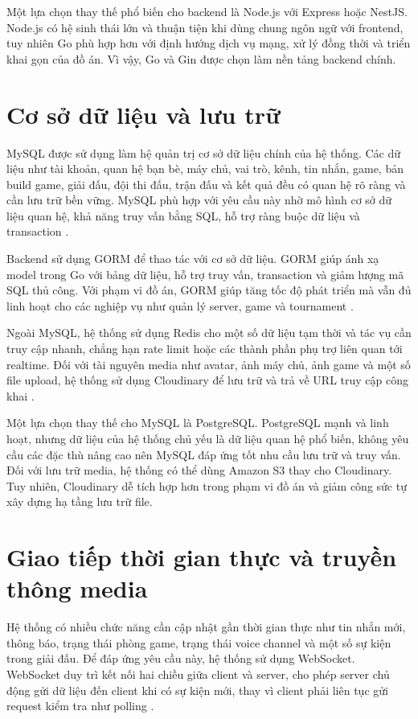 \documentclass[../DoAn.tex]{subfiles}
\begin{document}
Một lựa chọn thay thế phổ biến cho backend là Node.js với Express hoặc NestJS. Node.js có hệ sinh thái lớn và thuận tiện khi dùng chung ngôn ngữ với frontend, tuy nhiên Go phù hợp hơn với định hướng dịch vụ mạng, xử lý đồng thời và triển khai gọn của đồ án. Vì vậy, Go và Gin được chọn làm nền tảng backend chính.

\section{Cơ sở dữ liệu và lưu trữ}
\label{section:3.4}

MySQL được sử dụng làm hệ quản trị cơ sở dữ liệu chính của hệ thống. Các dữ liệu như tài khoản, quan hệ bạn bè, máy chủ, vai trò, kênh, tin nhắn, game, bản build game, giải đấu, đội thi đấu, trận đấu và kết quả đều có quan hệ rõ ràng và cần lưu trữ bền vững. MySQL phù hợp với yêu cầu này nhờ mô hình cơ sở dữ liệu quan hệ, khả năng truy vấn bằng SQL, hỗ trợ ràng buộc dữ liệu và transaction \cite{mysql-84}.

Backend sử dụng GORM để thao tác với cơ sở dữ liệu. GORM giúp ánh xạ model trong Go với bảng dữ liệu, hỗ trợ truy vấn, transaction và giảm lượng mã SQL thủ công. Với phạm vi đồ án, GORM giúp tăng tốc độ phát triển mà vẫn đủ linh hoạt cho các nghiệp vụ như quản lý server, game và tournament \cite{gorm-docs}.

Ngoài MySQL, hệ thống sử dụng Redis cho một số dữ liệu tạm thời và tác vụ cần truy cập nhanh, chẳng hạn rate limit hoặc các thành phần phụ trợ liên quan tới realtime. Đối với tài nguyên media như avatar, ảnh máy chủ, ảnh game và một số file upload, hệ thống sử dụng Cloudinary để lưu trữ và trả về URL truy cập công khai \cite{redis-docs,cloudinary-go}.

Một lựa chọn thay thế cho MySQL là PostgreSQL. PostgreSQL mạnh và linh hoạt, nhưng dữ liệu của hệ thống chủ yếu là dữ liệu quan hệ phổ biến, không yêu cầu các đặc thù nâng cao nên MySQL đáp ứng tốt nhu cầu lưu trữ và truy vấn. Đối với lưu trữ media, hệ thống có thể dùng Amazon S3 thay cho Cloudinary. Tuy nhiên, Cloudinary dễ tích hợp hơn trong phạm vi đồ án và giảm công sức tự xây dựng hạ tầng lưu trữ file.

\section{Giao tiếp thời gian thực và truyền thông media}
\label{section:3.5}

Hệ thống có nhiều chức năng cần cập nhật gần thời gian thực như tin nhắn mới, thông báo, trạng thái phòng game, trạng thái voice channel và một số sự kiện trong giải đấu. Để đáp ứng yêu cầu này, hệ thống sử dụng WebSocket. WebSocket duy trì kết nối hai chiều giữa client và server, cho phép server chủ động gửi dữ liệu đến client khi có sự kiện mới, thay vì client phải liên tục gửi request kiểm tra như polling \cite{mdn-websocket}.
\end{document}

